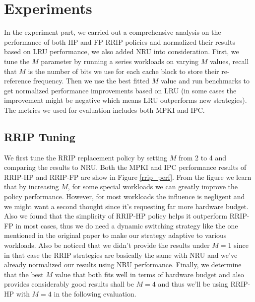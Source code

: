 \documentclass[conference]{IEEEtran}
\begin{document}
\section{Experiments}
In the experiment part, we carried out a comprehensive analysis on the performance of both HP and FP RRIP policies and normalized their results based on LRU performance, we also added NRU into consideration. First, we tune the $M$ parameter by running a series workloads on varying $M$ values, recall that $M$ is the number of bits we use for each cache block to store their re-reference frequency. Then we use the best fitted $M$ value and run benchmarks to get normalized performance improvements based on LRU (in some cases the improvement might be negative which means LRU outperforms new strategies). The metrics we used for evaluation includes both MPKI and IPC.
\subsection{RRIP Tuning}
We first tune the RRIP replacement policy by setting $M$ from 2 to 4 and comparing the results to NRU. Both the MPKI and IPC performance results of RRIP-HP and RRIP-FP are show in Figure \ref{rrip_perf}. From the figure we learn that by increasing $M$, for some special workloads we can greatly improve the policy performance. However, for most workloads the influence is negligent and we might want a second thought since it's requesting far more hardware budget. Also we found that the simplicity of RRIP-HP policy helps it outperform RRIP-FP in most cases, thus we do need a dynamic switching strategy like the one mentioned in the original paper to make our strategy adaptive to various workloads. Also be noticed that we didn't provide the results under $M=1$ since in that case the RRIP strategies are basically the same with NRU and we've already normalized our results using NRU performance. Finally, we determine that the best $M$ value that both fits well in terms of hardware budget and also provides considerably good results shall be $M=4$ and thus we'll be using RRIP-HP with $M=4$ in the following evaluation.
\end{document}
